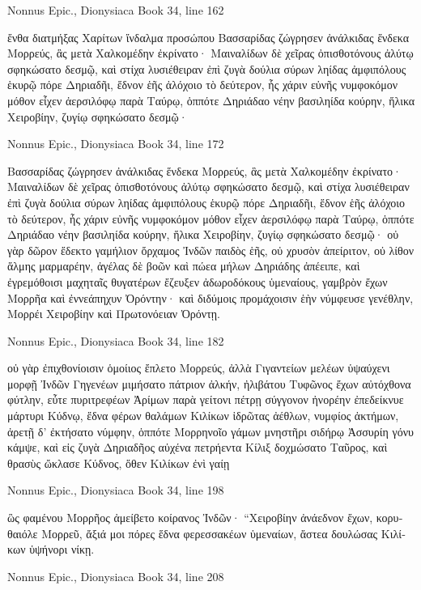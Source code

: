 \documentclass[12pt,letterpaper,twoside,final]{memoir}
\begin{document}
\begin{greek}
Nonnus Epic., Dionysiaca 
Book 34, line 162

ἔνθα διατμήξας Χαρίτων ἴνδαλμα προσώπου 
Βασσαρίδας ζώγρησεν ἀνάλκιδας ἕνδεκα Μορρεύς, 
ἃς μετὰ Χαλκομέδην ἐκρίνατο· Μαιναλίδων δὲ 
χεῖρας ὀπισθοτόνους ἀλύτῳ σφηκώσατο δεσμῷ, 
καὶ στίχα λυσιέθειραν ἐπὶ ζυγὰ δούλια σύρων   
ληίδας ἀμφιπόλους ἑκυρῷ πόρε Δηριαδῆι, 
ἕδνον ἑῆς ἀλόχοιο τὸ δεύτερον, ἧς χάριν εὐνῆς 
νυμφοκόμον μόθον εἶχεν ἀερσιλόφῳ παρὰ Ταύρῳ, 
ὁππότε Δηριάδαο νέην βασιληίδα κούρην, 
ἥλικα Χειροβίην, ζυγίῳ σφηκώσατο δεσμῷ· 




Nonnus Epic., Dionysiaca 
Book 34, line 172

Βασσαρίδας ζώγρησεν ἀνάλκιδας ἕνδεκα Μορρεύς, 
ἃς μετὰ Χαλκομέδην ἐκρίνατο· Μαιναλίδων δὲ 
χεῖρας ὀπισθοτόνους ἀλύτῳ σφηκώσατο δεσμῷ, 
καὶ στίχα λυσιέθειραν ἐπὶ ζυγὰ δούλια σύρων   
ληίδας ἀμφιπόλους ἑκυρῷ πόρε Δηριαδῆι, 
ἕδνον ἑῆς ἀλόχοιο τὸ δεύτερον, ἧς χάριν εὐνῆς 
νυμφοκόμον μόθον εἶχεν ἀερσιλόφῳ παρὰ Ταύρῳ, 
ὁππότε Δηριάδαο νέην βασιληίδα κούρην, 
ἥλικα Χειροβίην, ζυγίῳ σφηκώσατο δεσμῷ· 
οὐ γὰρ δῶρον ἔδεκτο γαμήλιον ὄρχαμος Ἰνδῶν 
παιδὸς ἑῆς, οὐ χρυσὸν ἀπείριτον, οὐ λίθον ἅλμης 
μαρμαρέην, ἀγέλας δὲ βοῶν καὶ πώεα μήλων 
Δηριάδης ἀπέειπε, καὶ ἐγρεμόθοισι μαχηταῖς 
θυγατέρων ἔζευξεν ἀδωροδόκους ὑμεναίους, 
γαμβρὸν ἔχων Μορρῆα καὶ ἐννεάπηχυν Ὀρόντην· 
καὶ διδύμοις προμάχοισιν ἑὴν νύμφευσε γενέθλην, 
Μορρέι Χειροβίην καὶ Πρωτονόειαν Ὀρόντῃ. 



Nonnus Epic., Dionysiaca 
Book 34, line 182

οὐ γὰρ ἐπιχθονίοισιν ὁμοίιος ἔπλετο Μορρεύς, 
ἀλλὰ Γιγαντείων μελέων ὑψαύχενι μορφῇ 
Ἰνδῶν Γηγενέων μιμήσατο πάτριον ἀλκήν, 
ἠλιβάτου Τυφῶνος ἔχων αὐτόχθονα φύτλην, 
εὖτε πυριτρεφέων Ἀρίμων παρὰ γείτονι πέτρῃ 
σύγγονον ἠνορέην ἐπεδείκνυε μάρτυρι Κύδνῳ, 
ἕδνα φέρων θαλάμων Κιλίκων ἱδρῶτας ἀέθλων, 
νυμφίος ἀκτήμων, ἀρετῇ δ' ἐκτήσατο νύμφην, 
ὁππότε Μορρηνοῖο γάμων μνηστῆρι σιδήρῳ   
Ἀσσυρίη γόνυ κάμψε, καὶ εἰς ζυγὰ Δηριαδῆος 
αὐχένα πετρήεντα Κίλιξ δοχμώσατο Ταῦρος, 
καὶ θρασὺς ὤκλασε Κύδνος, ὅθεν Κιλίκων ἐνὶ γαίῃ 




Nonnus Epic., Dionysiaca 
Book 34, line 198

ὣς φαμένου Μορρῆος ἀμείβετο κοίρανος Ἰνδῶν· 
 “Χειροβίην ἀνάεδνον ἔχων, κορυθαιόλε Μορρεῦ, 
ἄξιά μοι πόρες ἕδνα φερεσσακέων ὑμεναίων, 
ἄστεα δουλώσας Κιλίκων ὑψήνορι νίκῃ. 



Nonnus Epic., Dionysiaca 
Book 34, line 208


\end{greek}
\end{document}
